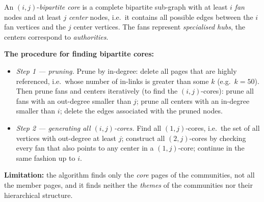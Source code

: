 \documentclass[11pt,a4paper]{article}
\theoremstyle{definition}
\begin{document}
\begin{defbox}
An $(i,j)$-\emph{bipartite core} is a complete bipartite sub-graph with at least $i$ \emph{fan} nodes
and at least $j$ \emph{center} nodes, i.e.\ it contains all possible edges between the $i$ fan
vertices and the $j$ center vertices. The fans represent \emph{specialised hubs}, the centers
correspond to \emph{authorities}.

\textbf{The procedure for finding bipartite cores:}
\begin{itemize}
\item \emph{Step 1 --- pruning.} Prune by in-degree: delete all pages that are highly referenced,
      i.e.\ whose number of in-links is greater than some $k$ (e.g.\ $k=50$). Then prune fans and
      centers iteratively (to find the $(i,j)$-cores): prune all fans with an out-degree smaller than
      $j$; prune all centers with an in-degree smaller than $i$; delete the edges associated with the
      pruned nodes.
\item \emph{Step 2 --- generating all $(i,j)$-cores.} Find all $(1,j)$-cores, i.e.\ the set of all
      vertices with out-degree at least $j$; construct all $(2,j)$-cores by checking every fan that
      also points to any center in a $(1,j)$-core; continue in the same fashion up to $i$.
\end{itemize}
\textbf{Limitation:} the algorithm finds only the \emph{core} pages of the communities, not all the
member pages, and it finds neither the \emph{themes} of the communities nor their hierarchical
structure.
\end{defbox}
\end{document}

